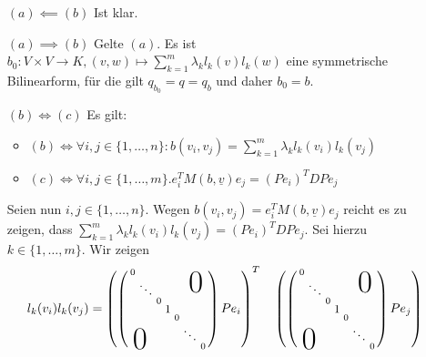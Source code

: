 \documentclass[../../main.tex]{subfiles}
\begin{document}
\begin{cproof}
	\begin{itemize}
		\item[$(a)\impliedby (b)$] Ist klar.
		\item[$(a)\implies (b)$] Gelte $(a)$. Es ist $b_0: V\times V\to K, (v,w)\mapsto \sum_{k=1}^m\lambda_k l_k(v)l_k(w)$ eine symmetrische Bilinearform, für die gilt $q_{b_0}=q=q_b$ und daher $b_0=b$.
		\item[$(b)\Longleftrightarrow (c)$] Es gilt:
		\begin{itemize}
			\item $(b)\Longleftrightarrow \forall i,j\in\{1,\ldots ,n\}: b(v_i,v_j)=\sum_{k=1}^m\lambda_k l_k(v_i)l_k(v_j)$
			\item $(c)\Longleftrightarrow \forall i,j\in\{1,\ldots ,m\}. e_i^TM(b,\underline{v})e_j=	(Pe_i)^TDPe_j$
		\end{itemize}
		Seien nun $i,j\in\{1,\ldots ,n\}$. Wegen $b(v_i,v_j)=e_i^TM(b,\underline{v})e_j$ reicht es zu zeigen, dass $\sum_{k=1}^m\lambda_k l_k(v_i)l_k(v_j)=(Pe_i)^TDPe_j$. Sei hierzu $k\in\{1,\ldots ,m\}$. Wir zeigen
		\begin{align*}
			l_k(v_i)l_k(v_j)&=\left(\left(\begin{smallmatrix}
				0 & & & & & &\llap{$\overset{\blap{\Huge 0}}{~}$}\\
				& \ddots & & & &\\ 
				& & 0 & & & &\\
				& & & \tikz[remember picture]\node[inner sep=0pt] (a) {\small 1}; & & &\\& & &  & 0 & &\\& & & & &\ddots &\\
				\rlap{\tlap{\Huge 0}} & & & & & &0
			\end{smallmatrix}\right)Pe_i\right)^T& &\left(\left(\begin{smallmatrix}
				0 & & & & & &\llap{$\overset{\blap{\Huge 0}}{~}$}\\
				& \ddots & & & &\\ 
				& & 0 & & & &\\
				& & & \tikz[remember picture]\node[inner sep=0pt] (c) {\small 1}; & & &\\& & &  & 0 & &\\& & & & &\ddots &\\
				\rlap{\tlap{\Huge 0}} & & & & & &0
			\end{smallmatrix}\right)Pe_j\right)\\
				&\, & &\\

\end{align*}
\end{itemize}
\end{cproof}
\end{document}
